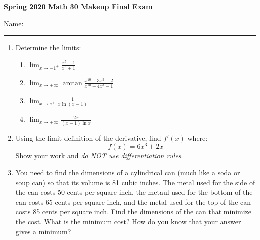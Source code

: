 \documentclass[letterpaper,12pt,fleqn]{article}
\begin{document}
   

\begin{center}
  \large
  \textbf{Spring 2020 Math 30 Makeup Final Exam}
\end{center}

\vspace{0.5in}

Name: \rule{4in}{1pt}

\vspace{0.5in}

\begin{enumerate}[left=0in]
\item Determine the limits:

  \vspace{0.5in}

  \begin{enumerate}
  \item \(\displaystyle\lim_{x\to-1^+}\frac{x^{5}-1}{x^{5}+1}\)

    \vspace{1in}

  \item \(\displaystyle \lim_{x\to +\infty}\arctan \frac{x^{10}-3x^5-2}{x^{10}+4x^3-1}\)

    \vspace{1in}

  \item \(\displaystyle \lim_{x\to e^+}\frac{1}{x \ln(x-1)}\)

    \vspace{1in}

  \item \(\displaystyle \lim_{x\to +\infty}\frac{2x}{(x-1)\ln x}\)
  \end{enumerate}

  \newpage

\item Using the limit definition of the derivative, find \(f'(x)\) where:
  \[f(x) = 6x^3 + 2x\]
  Show your work and \emph{do NOT use differentiation rules}.

  \newpage

\item You need to find the dimensions of a cylindrical can (much like a soda or soup can) so that its volume is 81
  cubic inches.  The metal used for the side of the can costs 50 cents per square inch, the metaul used for the
  bottom of the can costs 65 cents per square inch, and the metal used for the top of the can costs 85 cents per
  square inch.  Find the dimensions of the can that minimize the cost.  What is the minimum cost?  How do you know
  that your answer gives a minimum?


\end{enumerate}
\end{document}
